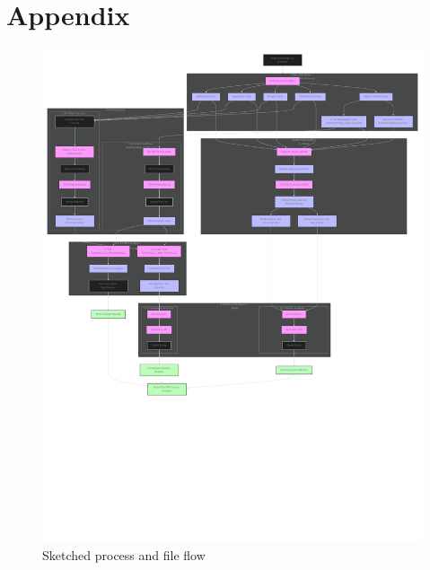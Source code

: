\section{Appendix} \label{app}

\begin{figure}[H]
    \centering
    \includegraphics[width=1\linewidth]{imgs/process_flow.pdf}
    \caption{Sketched process and file flow}
    \label{fig:process_flow}
\end{figure}